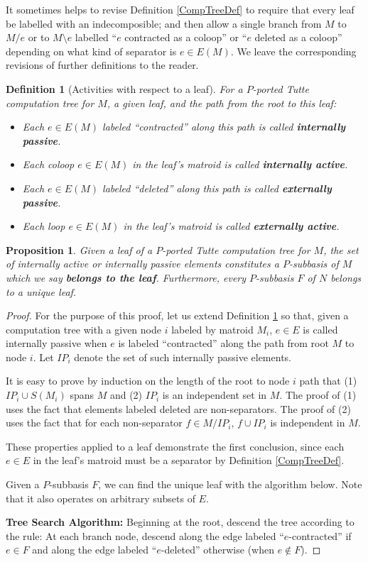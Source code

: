 \documentclass[12pt,leqno]{amsart}
\newtheorem{prop}[lem]{Proposition}
\newtheorem{definition}[lem]{Definition}
\theoremstyle{remark}
\begin{document}
It sometimes helps to revise Definition \ref{CompTreeDef} to require
that every leaf be labelled with an indecomposible; and then allow
a single branch from $M$ to $M/e$ or to $M\setminus e$
labelled ``$e$ contracted as a coloop'' or ``$e$ deleted as a coloop'' 
depending on what kind of separator is $e\in E(M)$.  We leave
the corresponding revisions of further definitions to the reader.


\begin{definition}[Activities with respect to a leaf]
\label{ActivityTreeDef}
For a $P$-ported Tutte computation tree for $M$,
a given leaf, and the path from the root to this leaf:
\begin{itemize}
\item Each $e\in E(M)$ labeled ``contracted'' along this path
is called \textbf{internally passive}.
\item Each coloop $e\in E(M)$ in the leaf's matroid is
called \textbf{internally active}.
\item Each $e\in E(M)$ labeled ``deleted'' along this path
is called \textbf{externally passive}.
\item Each loop $e\in E(M)$ in the leaf's matroid is
called \textbf{externally active}.
\end{itemize}
\end{definition}

\begin{prop}
Given a leaf of a $P$-ported Tutte computation tree for $M$,
the set of internally active or internally passive elements 
constitutes a 
$P$-subbasis of $M$ which we say 
\textbf{belongs to the leaf}.  
Furthermore, every $P$-subbasis $F$ of $N$ belongs to a unique leaf.
\end{prop}

\begin{proof}
For the purpose of this proof, let us extend Definition \ref{ActivityTreeDef}
so that, given a computation tree with a given node $i$ 
labeled by matroid $M_i$,
$e\in E$ is called internally passive when $e$ is labeled 
``contracted'' along the path from root $M$ to
node $i$.  Let $IP_i$ denote the set of such internally passive 
elements.

It is easy to prove by induction on the length of the root to node $i$ path
that
(1) $IP_i\cup S(M_i)$ spans $M$ and 
(2) $IP_i$ is an independent set in $M$.  The proof
of (1) uses the fact that elements labeled deleted are non-separators.  The
proof of (2) uses the fact that for each non-separator 
$f\in M/IP_i$, $f\cup IP_i$ is independent in $M$.

These properties applied to a leaf demonstrate the first conclusion,
since each $e\in E$ in the leaf's matroid must be a separator by Definition 
\ref{CompTreeDef}.

Given a $P$-subbasis $F$, we can find the unique leaf with the
algorithm below.  Note that it also operates on arbitrary subsets of $E$.

\textbf{Tree Search Algorithm:} Beginning
at the root, descend the tree according to the rule: At each branch node,
descend along the edge labeled ``$e$-contracted'' if $e\in F$ and along
the edge labeled ``$e$-deleted'' otherwise (when $e\not\in F$).
\end{proof}
\end{document}
